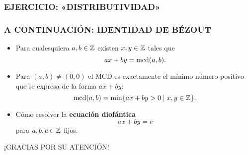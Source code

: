 \begin{frame}
  \frametitle{EJERCICIO: «DISTRIBUTIVIDAD»}


\end{frame}

\begin{frame}
  \frametitle{A CONTINUACIÓN: IDENTIDAD DE BÉZOUT}

  \begin{itemize}
  \item<2-> Para cualesquiera $a,b \in \mathbb{Z}$ existen $x,y \in \mathbb{Z}$ tales que
    $$ax + by = \operatorname{mcd} (a,b).$$

  \item<3-> Para $(a,b) \ne (0,0)$ el MCD es exactamente el mínimo número positivo
    que se expresa de la forma $ax + by$:
    $$\operatorname{mcd} (a,b) = \min \{ ax + by > 0 \mid x,y \in \mathbb{Z} \}.$$

  \item<4-> Cómo resolver la \textbf{ecuación diofántica}
    $$ax + by = c$$
    para $a,b,c \in \mathbb{Z}$ fijos.
  \end{itemize}
\end{frame}

\begin{frame}

  \vfill

  \begin{center}\huge\headingfont
    ¡GRACIAS POR SU ATENCIÓN!
  \end{center}

  \vfill
\end{frame}

